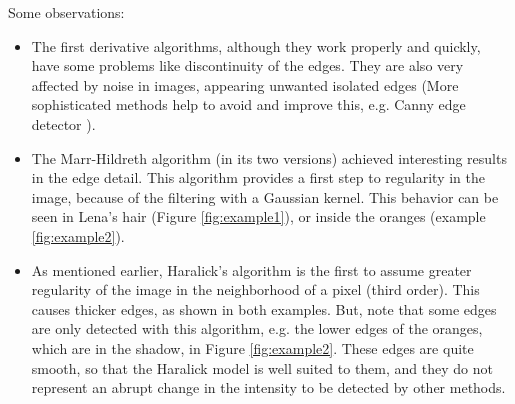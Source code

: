 \documentclass{ipol}
\numberwithin{equation}{section}
\numberwithin{table}{section}
\numberwithin{figure}{section}
\begin{document}
Some observations: 
\begin{itemize}
	\item The first derivative algorithms, although they work properly and quickly, have some problems like discontinuity of the edges. They are also very affected by noise in images, appearing unwanted isolated edges (More sophisticated methods help to avoid and improve this, e.g. Canny edge detector \cite{Canny1986}). \\
	\item The Marr-Hildreth algorithm (in its two versions) achieved interesting results in the edge detail. This algorithm provides a first step to regularity in the image, because of the filtering with a Gaussian kernel. This behavior can be seen in Lena's hair (Figure \ref{fig:example1}), or inside the oranges (example \ref{fig:example2}). \\
	\item As mentioned earlier, Haralick's algorithm is the first to assume greater regularity of the image in the neighborhood of a pixel (third order). This causes thicker edges, as shown in both examples. But, note that some edges are only detected with this algorithm, e.g. the lower edges of the oranges, which are in the shadow, in Figure \ref{fig:example2}. These edges are quite smooth, so that the Haralick model is well suited to them, and they do not represent an abrupt change in the intensity to be detected by other methods. \\
\end{itemize}
\end{document}
